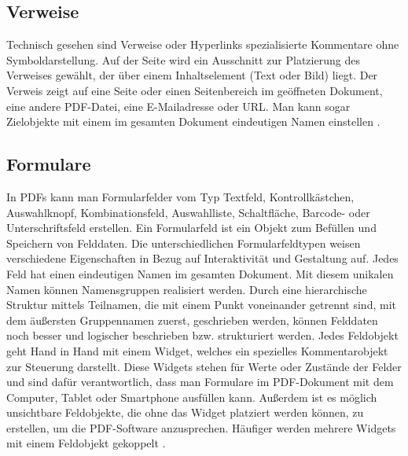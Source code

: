 \subsection{Verweise}
Technisch gesehen sind Verweise oder Hyperlinks spezialisierte Kommentare ohne Symboldarstellung. Auf der Seite wird ein Ausschnitt zur Platzierung des Verweises gewählt, der über einem Inhaltselement (Text oder Bild) liegt. Der Verweis zeigt auf eine Seite oder einen Seitenbereich im geöffneten Dokument, eine andere PDF-Datei, eine E-Mailadresse oder URL. Man kann sogar Zielobjekte mit einem im gesamten Dokument eindeutigen Namen einstellen \cite{softx}. 

\subsection{Formulare}
In PDFs kann man Formularfelder vom Typ Textfeld, Kontrollkästchen, Auswahlknopf, Kombinationsfeld, Auswahlliste, Schaltfläche, Barcode- oder Unterschriftsfeld erstellen. Ein Formularfeld ist ein Objekt zum Befüllen und Speichern von Felddaten. Die unterschiedlichen Formularfeldtypen weisen verschiedene Eigenschaften in Bezug auf Interaktivität und Gestaltung auf. Jedes Feld hat einen eindeutigen Namen im gesamten Dokument. Mit diesem unikalen Namen können Namensgruppen realisiert werden. Durch eine hierarchische Struktur mittels Teilnamen, die mit einem Punkt voneinander getrennt sind, mit dem äußersten Gruppennamen zuerst, geschrieben werden, können Felddaten noch besser und logischer beschrieben bzw. strukturiert werden. Jedes Feldobjekt geht Hand in Hand mit einem Widget, welches ein spezielles Kommentarobjekt zur Steuerung darstellt. Diese Widgets stehen für Werte oder Zustände der Felder und sind dafür verantwortlich, dass man Formulare im PDF-Dokument mit dem Computer, Tablet oder Smartphone ausfüllen kann. Außerdem ist es möglich unsichtbare Feldobjekte, die ohne das Widget platziert werden können, zu erstellen, um die PDF-Software anzusprechen. Häufiger werden mehrere Widgets mit einem Feldobjekt gekoppelt \cite{softx}. \\
